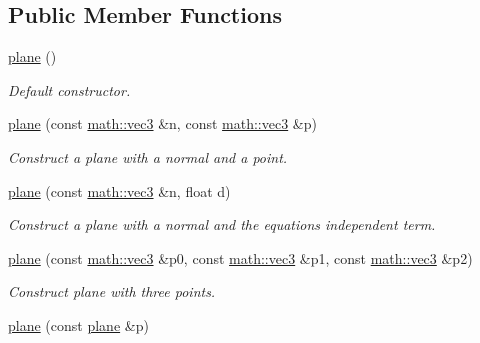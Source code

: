 \subsection*{Public Member Functions}
\begin{DoxyCompactItemize}
\item 
\mbox{\label{classphysim_1_1geometry_1_1plane_a7d08b9745bd79eb87a315d8f5d62cfa7}} 
\hyperlink{classphysim_1_1geometry_1_1plane_a7d08b9745bd79eb87a315d8f5d62cfa7}{plane} ()
\begin{DoxyCompactList}\small\item\em Default constructor. \end{DoxyCompactList}\item 
\hyperlink{classphysim_1_1geometry_1_1plane_a9e1a0d74b5ecbbdb5b144003a915d64b}{plane} (const \hyperlink{structphysim_1_1math_1_1vec3}{math\+::vec3} \&n, const \hyperlink{structphysim_1_1math_1_1vec3}{math\+::vec3} \&p)
\begin{DoxyCompactList}\small\item\em Construct a plane with a normal and a point. \end{DoxyCompactList}\item 
\hyperlink{classphysim_1_1geometry_1_1plane_aae52703bb0288ee3412d066475927253}{plane} (const \hyperlink{structphysim_1_1math_1_1vec3}{math\+::vec3} \&n, float d)
\begin{DoxyCompactList}\small\item\em Construct a plane with a normal and the equation\textquotesingle{}s independent term. \end{DoxyCompactList}\item 
\hyperlink{classphysim_1_1geometry_1_1plane_a7ff5e0444f792d759198fb7339c9dc1a}{plane} (const \hyperlink{structphysim_1_1math_1_1vec3}{math\+::vec3} \&p0, const \hyperlink{structphysim_1_1math_1_1vec3}{math\+::vec3} \&p1, const \hyperlink{structphysim_1_1math_1_1vec3}{math\+::vec3} \&p2)
\begin{DoxyCompactList}\small\item\em Construct plane with three points. \end{DoxyCompactList}\item 
\mbox{\label{classphysim_1_1geometry_1_1plane_afefa8a3b1fa593437b911a6ba9338171}} 
\hyperlink{classphysim_1_1geometry_1_1plane_afefa8a3b1fa593437b911a6ba9338171}{plane} (const \hyperlink{classphysim_1_1geometry_1_1plane}{plane} \&p)

\end{DoxyCompactItemize}
